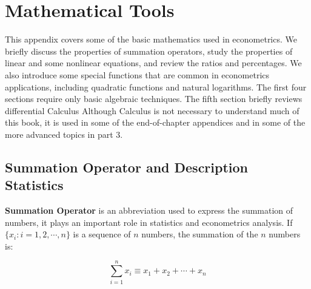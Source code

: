 \documentclass[11pt]{elegantbook}
\begin{document}
\nocite{en2,en3}

\printbibliography[heading=bibintoc, title=\ebibname]
\appendix


\chapter{Mathematical Tools}

This appendix covers some of the basic mathematics used in econometrics. We briefly discuss the properties of summation operators, study the properties of linear and some nonlinear equations, and review the ratios and percentages. We also introduce some special functions that are common in econometrics applications, including quadratic functions and natural logarithms. The first four sections require only basic algebraic techniques. The fifth section briefly reviews differential Calculus Although Calculus is not necessary to understand much of this book, it is used in some of the end-of-chapter appendices and in some of the more advanced topics in part 3.

\section{Summation Operator and Description Statistics}

\textbf{Summation Operator} is an abbreviation used to express the summation of numbers, it plays an important role in statistics and econometrics analysis. If $\{x_i: i=1, 2, \cdots, n\}$ is a sequence of $n$ numbers, the summation of the $n$ numbers is:

\begin{equation}
\sum_{i=1}^n x_i \equiv x_1 + x_2 +\cdots + x_n
\end{equation}
\end{document}
